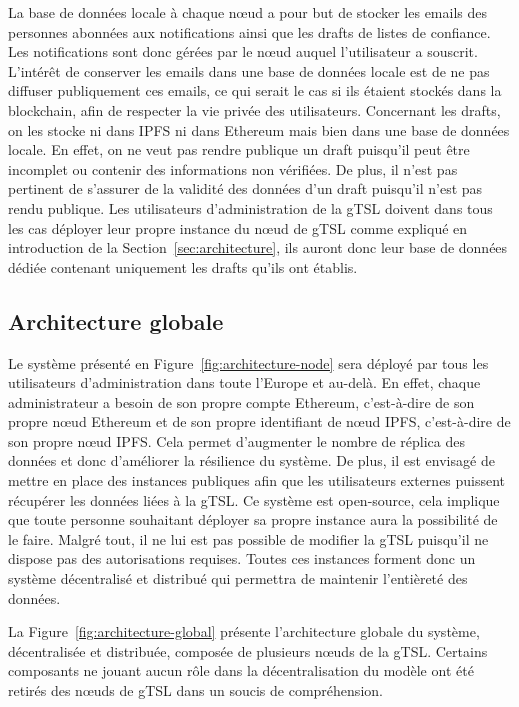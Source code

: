 \documentclass{tnreport}
\begin{document}
La base de données locale à chaque nœud a pour but de stocker les emails des personnes abonnées aux notifications ainsi que les drafts de listes de confiance. Les notifications sont donc gérées par le nœud auquel l'utilisateur a souscrit. L'intérêt de conserver les emails dans une base de données locale est de ne pas diffuser publiquement ces emails, ce qui serait le cas si ils étaient stockés dans la blockchain, afin de respecter la vie privée des utilisateurs. Concernant les drafts, on les stocke ni dans IPFS ni dans Ethereum mais bien dans une base de données locale. En effet, on ne veut pas rendre publique un draft puisqu'il peut être incomplet ou contenir des informations non vérifiées. De plus, il n'est pas pertinent de s'assurer de la validité des données d'un draft puisqu'il n'est pas rendu publique. Les utilisateurs d'administration de la gTSL doivent dans tous les cas déployer leur propre instance du nœud de gTSL comme expliqué en introduction de la Section~\ref{sec:architecture}, ils auront donc leur base de données dédiée contenant uniquement les drafts qu'ils ont établis.

\subsection{Architecture globale}

Le système présenté en Figure~\ref{fig:architecture-node} sera déployé par tous les utilisateurs d'administration dans toute l'Europe et au-delà. En effet, chaque administrateur a besoin de son propre compte Ethereum, c'est-à-dire de son propre nœud Ethereum et de son propre identifiant de nœud IPFS, c'est-à-dire de son propre nœud IPFS. Cela permet d'augmenter le nombre de réplica des données et donc d'améliorer la résilience du système. De plus, il est envisagé de mettre en place des instances publiques afin que les utilisateurs externes puissent récupérer les données liées à la gTSL. Ce système est open-source, cela implique que toute personne souhaitant déployer sa propre instance aura la possibilité de le faire. Malgré tout, il ne lui est pas possible de modifier la gTSL puisqu'il ne dispose pas des autorisations requises. Toutes ces instances forment donc un système décentralisé et distribué qui permettra de maintenir l'entièreté des données. 

La Figure~\ref{fig:architecture-global} présente l'architecture globale du système, décentralisée et distribuée, composée de plusieurs nœuds de la gTSL. Certains composants ne jouant aucun rôle dans la décentralisation du modèle ont été retirés des nœuds de gTSL dans un soucis de compréhension.
\clearpage
\end{document}

